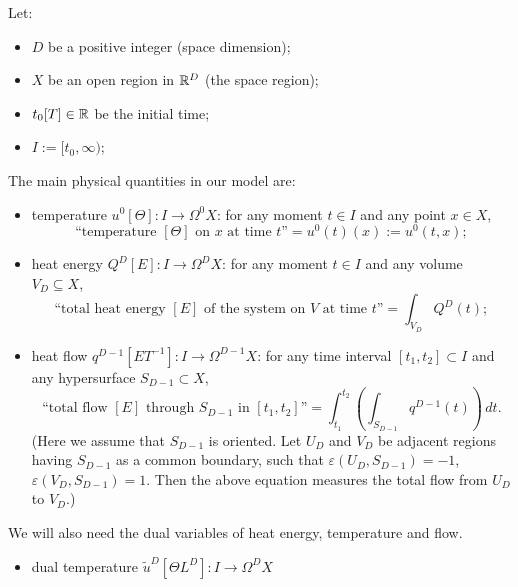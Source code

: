 \begin{discussion}
  \label{idec/heat_transport/continuous/model_with_differential_forms-discussion}
  Let:
  \begin{itemize}
    \item
      $D$ be a positive integer (space dimension);
    \item
      $X$ be an open region in $\mathbb{R}^D$ (the space region);
    \item
      $t_0 [T] \in \mathbb{R}$ be the initial time;
    \item
      $I := [t_0, \infty)$;
  \end{itemize}
  The main physical quantities in our model are:
  \begin{itemize}
    \item
      temperature $u^0 [\Theta] \colon I \to \Omega^0 X$:
      for any moment $t \in I$ and any point $x \in X$,
      \begin{equation}
        \text{``temperature $[\Theta]$ on $x$ at time $t$''}
        = u^0(t)(x) := u^0(t, x);
      \end{equation}
    \item
      heat energy $Q^D [E] \colon I \to \Omega^D X$:
      for any moment $t \in I$ and any volume $V_D \subseteq X$,
      \begin{equation}
        \text{``total heat energy $[E]$ of the system on $V$ at time $t$''}
        = \int_{V_D} Q^D(t);
      \end{equation}
    \item
      heat flow $q^{D - 1} [E T^{-1}] \colon I \to \Omega^{D - 1} X$:
      for any time interval $[t_1, t_2] \subset I$
      and any hypersurface $S_{D - 1} \subset X$,
      \begin{equation}
        \text{``total flow $[E]$ through $S_{D - 1}$ in $[t_1, t_2]$''}
        = \int_{t_1}^{t_2}\left(\int_{S_{D - 1}} q^{D - 1}(t)\right)\, d t.
      \end{equation}
      (Here we assume that $S_{D - 1}$ is oriented.
       Let $U_D$ and $V_D$ be adjacent regions having $S_{D - 1}$ as a common
       boundary, such that $\varepsilon(U_D, S_{D - 1}) = -1$,
       $\varepsilon(V_D, S_{D - 1}) = 1$.
       Then the above equation measures the total flow from $U_D$ to $V_D$.)
  \end{itemize}
  We will also need the dual variables of heat energy, temperature and flow.
  \begin{itemize}
    \item
      dual temperature $\tilde{u}^D [\Theta L^D] \colon I \to \Omega^D X$

\end{itemize}
\end{discussion}
